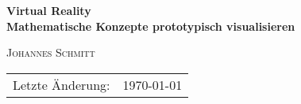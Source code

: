 
\begin{titlepage}



\begin{flushright}
\huge \bfseries {Virtual Reality}\\[1.4cm]
\huge \bfseries {Mathematische Konzepte prototypisch visualisieren}\\[0.4cm]
\end{flushright}

\begin{flushright}
	\textsc{Johannes Schmitt}\\
\end{flushright}


\vfill %

\renewcommand{\arraystretch}{1.5}
\begin{flushleft}
	\begin{tabular}[H]{ll}
    \large{Letzte \"Anderung:} & \large{\today} \\
	\end{tabular}
\end{flushleft}

\renewcommand{\arraystretch}{1}

\vspace{24pt}


\end{titlepage}
